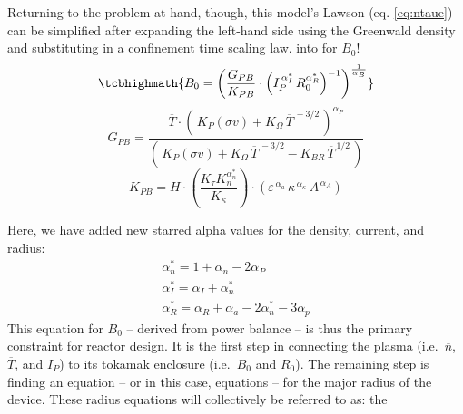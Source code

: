 Returning to the problem at hand, though, this model's Lawson  (eq. \ref{eq:ntaue}) can be simplified after expanding the left-hand side using the Greenwald density and substituting in a confinement time scaling law.  into  for $B_0$!
\begin{equation}
	\label{eq:b_0_power}
	\tcbhighmath{
	B_0 = \left( \frac{ G_{PB} }{ K_{PB} } \cdot \left( I_P^{\,\alpha_I^*} \, R_0^{ \alpha_R^* } \right)^{-1} \right) ^ { \frac{1}{ \alpha_B } }
	}
\end{equation}
\begin{equation}
	G_{PB} = \frac{ \overline{T} \cdot \left( \, K_P (\sigma v) + K_\Omega  \, \overline{T}^{  \,-3/2 } \, \right) ^ { \alpha_P } }{ \left( \, K_P (\sigma v) + K_\Omega  \, \overline{T}^{  \,-3/2 } - K_{BR} \, \overline{T}^{  \,1/2 } \, \right) }
\end{equation}
\begin{equation}
	K_{PB} = H \cdot \left( \frac{ K_\tau K_n^{\alpha_n^*}}{K_\kappa } \right) \cdot \left(
     \varepsilon^{\,\alpha_a} \, \kappa^{\,\alpha_\kappa} \, A^{\,\alpha_A}\right)
\end{equation}

Here, we have added new starred alpha values for the density, current, and radius:
\begin{gather}
  \alpha_n^* = 1 + \alpha_n - 2 \alpha_P \\
  \alpha_I^* = \alpha_I + \alpha_n^* \\
  \alpha_R^* = \alpha_R + \alpha_a - 2  \alpha_n^* - 3 \alpha_p
\end{gather}
This equation for $B_0$ -- derived from power balance -- is thus the primary constraint for reactor design. It is the first step in connecting the plasma (i.e.\ $\overline n$, $\overline T$, and $I_P$) to its tokamak enclosure (i.e.\ $B_0$ and $R_0$). The remaining step is finding an equation -- or in this case, equations -- for the major radius of the device. These radius equations will collectively be referred to as: the 


